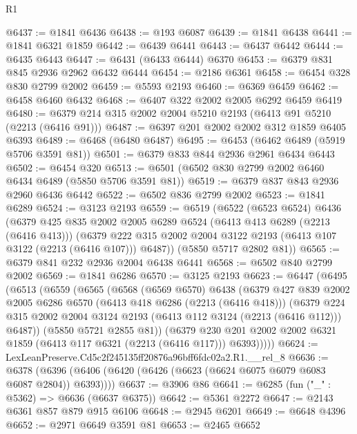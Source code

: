 \begin{lexlean}{R1}
\begin{coremodule}
@6437 := @1841 @6436
@6438 := @193 @6087
@6439 := @1841 @6438
@6441 := @1841 @6321 @1859
@6442 := @6439 @6441
@6443 := @6437 @6442
@6444 := @6435 @6443
@6447 := @6431 (@6433 @6444) @6370
@6453 := @6379 @831 @845 @2936 @2962 @6432 @6444
@6454 := @2186 @6361
@6458 := @6454 @328 @830 @2799 @2002
@6459 := @5593 @2193
@6460 := @6369 @6459
@6462 := @6458 @6460 @6432
@6468 := @6407 @322 @2002 @2005 @6292 @6459 @6419
@6480 := @6379 @214 @315 @2002 @2004 @5210 @2193 (@6413 @91 @5210 (@2213 (@6416 @91)))
@6487 := @6397 @201 @2002 @2002 @312 @1859 @6405 @6393
@6489 := @6468 (@6480 @6487)
@6495 := @6453 (@6462 @6489 (@5919 @5706 @3591 @81))
@6501 := @6379 @833 @844 @2936 @2961 @6434 @6443
@6502 := @6454 @320
@6513 := @6501 (@6502 @830 @2799 @2002 @6460 @6434 @6489 (@5850 @5706 @3591 @81))
@6519 := @6379 @837 @843 @2936 @2960 @6436 @6442
@6522 := @6502 @836 @2799 @2002
@6523 := @1841 @6289
@6524 := @3123 @2193
@6559 := @6519
    (@6522
      (@6523 @6524)
      @6436
      (@6379
        @425
        @835
        @2002
        @2005
        @6289
        @6524
        (@6413 @413 @6289 (@2213 (@6416 @413)))
        (@6379 @222 @315 @2002 @2004 @3122 @2193 (@6413 @107 @3122 (@2213 (@6416 @107))) @6487))
      (@5850 @5717 @2802 @81))
@6565 := @6379 @841 @232 @2936 @2004 @6438 @6441
@6568 := @6502 @840 @2799 @2002
@6569 := @1841 @6286
@6570 := @3125 @2193
@6623 := @6447
    (@6495
      (@6513
        (@6559
          (@6565
            (@6568
              (@6569 @6570)
              @6438
              (@6379
                @427
                @839
                @2002
                @2005
                @6286
                @6570
                (@6413 @418 @6286 (@2213 (@6416 @418)))
                (@6379
                  @224
                  @315
                  @2002
                  @2004
                  @3124
                  @2193
                  (@6413 @112 @3124 (@2213 (@6416 @112)))
                  @6487))
              (@5850 @5721 @2855 @81))
            (@6379
              @230
              @201
              @2002
              @2002
              @6321
              @1859
              (@6413 @117 @6321 (@2213 (@6416 @117)))
              @6393)))))
@6624 := LexLeanPreserve.Cd5c2f245135ff20876a96bff6fdc02a2.R1.__rel_8
@6636 := @6378 (@6396 (@6406 (@6420 (@6426 (@6623 (@6624 @6075 @6079 @6083 @6087 @2804)) @6393))))
@6637 := @3906 @86
@6641 := @6285 (fun ("_" : @5362) => @6636 (@6637 @6375))
@6642 := @5361 @2272
@6647 := @2143 @6361 @857 @879 @915 @6106
@6648 := @2945 @6201
@6649 := @6648 @4396
@6652 := @2971 @6649 @3591 @81
@6653 := @2465 @6652

\end{coremodule}
\end{lexlean}
